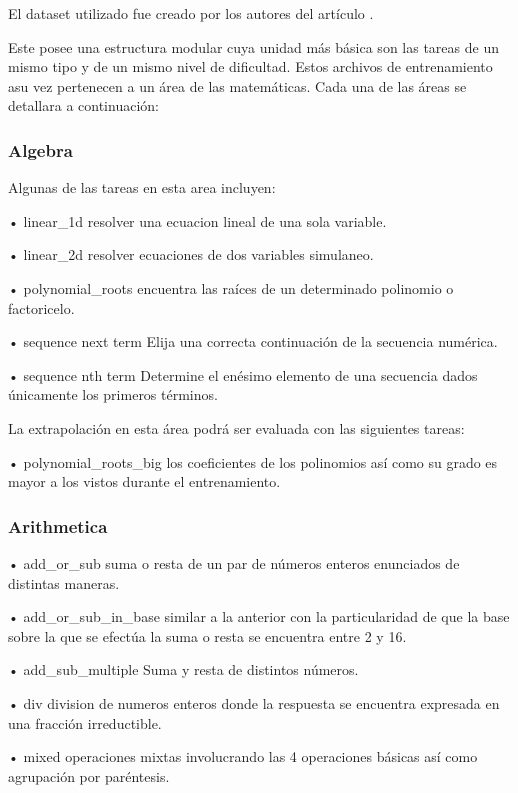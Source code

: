 \documentclass[conference]{IEEEtran}
\begin{document}
El dataset utilizado fue creado por los autores del artículo \cite{b7}.

Este posee una estructura modular cuya unidad más básica son las tareas de un mismo tipo y de un mismo nivel de dificultad. Estos archivos de entrenamiento asu vez pertenecen a un área de las matemáticas. Cada una de las áreas se detallara a continuación:

\subsubsection{Algebra}

Algunas de las tareas en esta area incluyen:

  • linear\_1d resolver una ecuacion lineal de una sola variable.
  
  • linear\_2d resolver ecuaciones de dos variables simulaneo.
  
  • polynomial\_roots encuentra las raíces de un determinado polinomio o factoricelo.
  
  • sequence next term Elija una correcta continuación de la secuencia numérica.
  
  • sequence nth term Determine el enésimo elemento de una secuencia dados únicamente los primeros términos.
  

La extrapolación en esta área podrá ser evaluada con las siguientes tareas:

  • polynomial\_roots\_big los coeficientes de los polinomios así como su grado es mayor a los vistos durante el entrenamiento.



\subsubsection{Arithmetica}
  
  • add\_or\_sub suma o resta de un par de números enteros enunciados de distintas maneras.
  
  • add\_or\_sub\_in\_base similar a la anterior con la particularidad de que la base sobre la que se efectúa la suma o resta se encuentra entre 2 y 16.
  
  • add\_sub\_multiple Suma y resta de distintos números. 
  
  • div division de numeros enteros donde la respuesta se encuentra expresada en una fracción irreductible.
  
  • mixed operaciones mixtas involucrando las 4 operaciones básicas así como agrupación por paréntesis.
  
\end{document}
